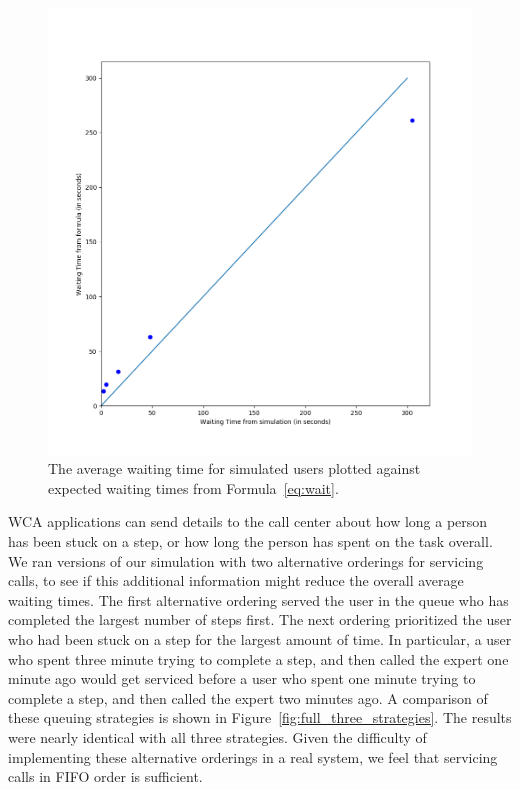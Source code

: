 \begin{figure}[H]
  \includegraphics[width=\textwidth]{figures/montecarlo/gof.png}
  \caption{
    The average waiting time for simulated users plotted against expected
    waiting times from Formula~\ref{eq:wait}.
  }\label{fig:gof}
\end{figure}

WCA applications can send details to the call center about how long a person has
been stuck on a step, or how long the person has spent on the task overall.
We ran versions of our simulation with two alternative orderings for servicing
calls, to see if this additional information might reduce the overall average
waiting times.
The first alternative ordering served the user in the queue who has completed
the largest number of steps first.
The next ordering prioritized the user who had been stuck on a step for the
largest amount of time.
In particular, a user who spent three minute trying to complete a step, and then
called the expert one minute ago would get serviced before a user who spent one
minute trying to complete a step, and then called the expert two minutes ago.
A comparison of these queuing strategies is shown in
Figure~\ref{fig:full_three_strategies}.
The results were nearly identical with all three strategies.
Given the difficulty of implementing these alternative orderings in a real
system, we feel that servicing calls in FIFO order is sufficient.

